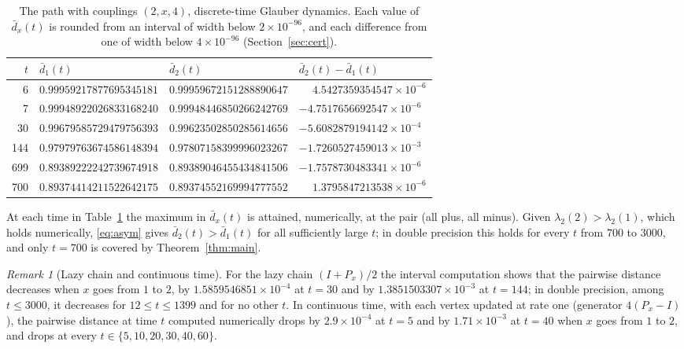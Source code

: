 \documentclass[11pt]{amsart}
\theoremstyle{remark}
\newtheorem{remark}[theorem]{Remark}
\newcommand{\dbar}{\bar d}
\begin{document}
\begin{table}[htbp]
\centering
\begin{tabular}{rlll}
\toprule
$t$ & $\dbar_1(t)$ & $\dbar_2(t)$ & $\dbar_2(t)-\dbar_1(t)$\\
\midrule
6 & $0.99959217877695345181$ & $0.99959672151288890647$ & $\phantom{-}4.5427359354547\times10^{-6}$\\
7 & $0.99948922026833168240$ & $0.99948446850266242769$ & $-4.7517656692547\times10^{-6}$\\
30 & $0.99679585729479756393$ & $0.99623502850285614656$ & $-5.6082879194142\times10^{-4}$\\
144 & $0.97979763674586148394$ & $0.97807158399996023267$ & $-1.7260527459013\times10^{-3}$\\
699 & $0.89389222242739674918$ & $0.89389046455434841506$ & $-1.7578730483341\times10^{-6}$\\
700 & $0.89374414211522642175$ & $0.89374552169994777552$ & $\phantom{-}1.3795847213538\times10^{-6}$\\
\bottomrule
\end{tabular}
\caption{The path with couplings $(2,x,4)$, discrete-time Glauber dynamics. Each value of $\dbar_x(t)$ is rounded from an interval of width below $2\times10^{-96}$, and each difference from one of width below $4\times10^{-96}$ (Section~\ref{sec:cert}).}\label{tab:main}
\end{table}

At each time in Table~\ref{tab:main} the maximum in $\dbar_x(t)$ is attained, numerically, at the pair (all plus, all minus). Given $\lambda_2(2)>\lambda_2(1)$, which holds numerically, \eqref{eq:asym} gives $\dbar_2(t)>\dbar_1(t)$ for all sufficiently large $t$; in double precision this holds for every $t$ from $700$ to $3000$, and only $t=700$ is covered by Theorem~\ref{thm:main}.

\begin{remark}[Lazy chain and continuous time]\label{rem:lazy}
For the lazy chain $(I+P_x)/2$ the interval computation shows that the pairwise distance decreases when $x$ goes from $1$ to $2$, by $1.5859546851\times10^{-4}$ at $t=30$ and by $1.3851503307\times10^{-3}$ at $t=144$; in double precision, among $t\le3000$, it decreases for $12\le t\le1399$ and for no other $t$. In continuous time, with each vertex updated at rate one (generator $4(P_x-I)$), the pairwise distance at time $t$ computed numerically drops by $2.9\times10^{-4}$ at $t=5$ and by $1.71\times10^{-3}$ at $t=40$ when $x$ goes from $1$ to $2$, and drops at every $t\in\{5,10,20,30,40,60\}$.
\end{remark}
\end{document}
